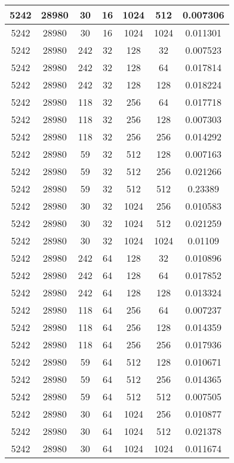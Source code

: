 \documentclass[9pt]{article}
\begin{document}
\begin{tabular}{|c|c|c|c|c|c|c| }
\hline
5242  & 28980  & 30  & 16  & 1024  & 512  & 0.007306 \\
\hline
5242  & 28980  & 30  & 16  & 1024  & 1024  & 0.011301 \\
\hline
5242  & 28980  & 242  & 32  & 128  & 32  & 0.007523 \\
\hline
5242  & 28980  & 242  & 32  & 128  & 64  & 0.017814 \\
\hline
5242  & 28980  & 242  & 32  & 128  & 128  & 0.018224 \\
\hline
5242  & 28980  & 118  & 32  & 256  & 64  & 0.017718 \\
\hline
5242  & 28980  & 118  & 32  & 256  & 128  & 0.007303 \\
\hline
5242  & 28980  & 118  & 32  & 256  & 256  & 0.014292 \\
\hline
5242  & 28980  & 59  & 32  & 512  & 128  & 0.007163 \\
\hline
5242  & 28980  & 59  & 32  & 512  & 256  & 0.021266 \\
\hline
5242  & 28980  & 59  & 32  & 512  & 512  & 0.23389 \\
\hline
5242  & 28980  & 30  & 32  & 1024  & 256  & 0.010583 \\
\hline
5242  & 28980  & 30  & 32  & 1024  & 512  & 0.021259 \\
\hline
5242  & 28980  & 30  & 32  & 1024  & 1024  & 0.01109 \\
\hline
5242  & 28980  & 242  & 64  & 128  & 32  & 0.010896 \\
\hline
5242  & 28980  & 242  & 64  & 128  & 64  & 0.017852 \\
\hline
5242  & 28980  & 242  & 64  & 128  & 128  & 0.013324 \\
\hline
5242  & 28980  & 118  & 64  & 256  & 64  & 0.007237 \\
\hline
5242  & 28980  & 118  & 64  & 256  & 128  & 0.014359 \\
\hline
5242  & 28980  & 118  & 64  & 256  & 256  & 0.017936 \\
\hline
5242  & 28980  & 59  & 64  & 512  & 128  & 0.010671 \\
\hline
5242  & 28980  & 59  & 64  & 512  & 256  & 0.014365 \\
\hline
5242  & 28980  & 59  & 64  & 512  & 512  & 0.007505 \\
\hline
5242  & 28980  & 30  & 64  & 1024  & 256  & 0.010877 \\
\hline
5242  & 28980  & 30  & 64  & 1024  & 512  & 0.021378 \\
\hline
5242  & 28980  & 30  & 64  & 1024  & 1024  & 0.011674 \\

\end{tabular}
\end{document}
